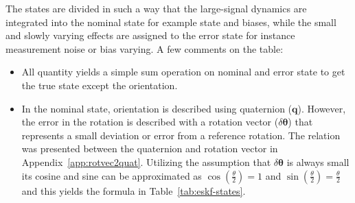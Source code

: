 The states are divided in such a way that the large-signal dynamics are integrated into the nominal state for example state and biases, while the small and slowly varying effects are assigned to the error state for instance measurement noise or bias varying. A few comments on the table:
\begin{itemize}
    \item 
    All quantity yields a simple sum operation on nominal and error state to get the true state except the orientation.
    \item
    In the nominal state, orientation is described using quaternion ($\mathbf{q}$). However, the error in the rotation is described with a rotation vector ($\delta\boldsymbol{\theta}$) that represents a small deviation or error from a reference rotation. The relation was presented between the quaternion and rotation vector in Appendix~\ref{app:rotvec2quat}. Utilizing the assumption that $\delta\boldsymbol{\theta}$ is always small its cosine and sine can be approximated as $\cos\left(\frac{\theta}{2}\right)=1$ and $\sin\left(\frac{\theta}{2}\right)=\frac{\theta}{2}$ and this yields the formula in Table~\ref{tab:eskf-states}.
    

\end{itemize}
